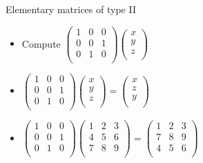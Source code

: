 \documentclass{beamer}
\begin{document}
\begin{frame}{Elementary matrices of type II}

\begin{itemize}
\item Compute $
\begin{pmatrix}
1 & 0 & 0 \\
0 & 0 & 1 \\
0 & 1 & 0 \\
\end{pmatrix}
\begin{pmatrix}
x \\
y \\
z  \\
\end{pmatrix}
$
\item
$
\begin{pmatrix}
1 & 0 & 0 \\
0 & 0 & 1 \\
0 & 1 & 0 \\
\end{pmatrix}
\begin{pmatrix}
x \\
y \\
z  \\
\end{pmatrix}
=
\begin{pmatrix}
x \\
z \\
y \\
\end{pmatrix}
$
\item
$
\begin{pmatrix}
1 & 0 & 0 \\
0 & 0 & 1 \\
0 & 1 & 0 \\
\end{pmatrix}
\begin{pmatrix}
1 & 2 & 3 \\
4 & 5 & 6 \\
7 & 8 & 9 \\
\end{pmatrix}
=
\begin{pmatrix}
1 & 2 & 3 \\
7 & 8 & 9 \\
4 & 5 & 6 \\
\end{pmatrix}
$

\end{itemize}
\end{frame}
\end{document}
